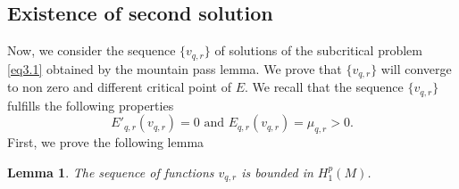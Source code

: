 \documentclass{Tran-l}
\newtheorem{lem}[thm]{Lemma}
\theoremstyle{definition}
\theoremstyle{remark}
\numberwithin{equation}{section}
\begin{document}
\subsection{Existence of second solution}
Now, we consider the sequence $\{v_{q,r}\}$ of solutions of the
subcritical problem \eqref{eq3.1} obtained by the mountain pass
lemma. We prove that $\{v_{q,r}\}$ will converge to non zero and
different critical point of $E$. We recall that the sequence
$\{v_{q,r}\}$ fulfills the following properties
\begin{equation} E'_{q,r}(v_{q,r})=0 \text{ and }
E_{q,r}(v_{q,r})=\mu_{q,r}>0.
\end{equation}
First, we prove the following lemma
\begin{lem}\label{lem6.1}
The sequence of functions $v_{q,r}$ is bounded in $H^p_1(M)$.
\end{lem}
\end{document}
